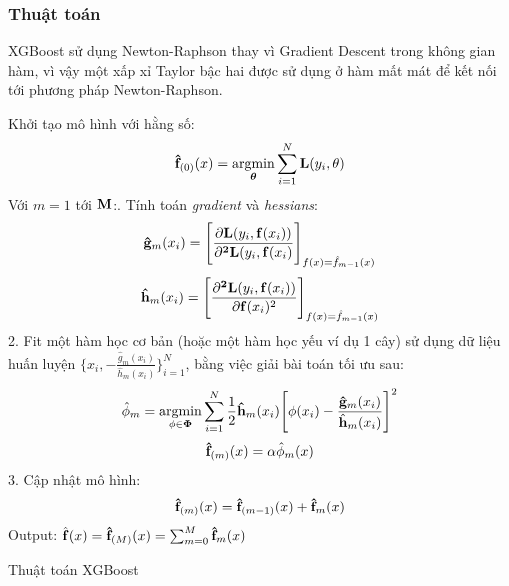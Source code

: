 \subsubsection{Thuật toán}
XGBoost sử dụng Newton-Raphson thay vì Gradient Descent trong không gian hàm, vì vậy một xấp xỉ Taylor bậc hai được sử dụng ở hàm mất mát để kết nối tới phương pháp Newton-Raphson.
    \begin{algorithm}[h!]
        \DontPrintSemicolon
        Khởi tạo mô hình với hằng số:
        \begin{equation*}
            \bold{\hat{f}}_{(0)}(x) = \underset{\boldsymbol{\theta}}{\mathrm{argmin}}\sum^N_{i=1}\bold{L}(y_i,\bold{\theta})
        \end{equation*}\;
        Với $m = 1$ tới $\bold{M}$:. Tính toán \emph{gradient} và \emph{hessians}:
        \begin{equation*}
            \bold{\hat{g}}_m(x_i) = \Bigg[\frac{\bold{\partial}\bold{L}(y_i,\bold{f}(x_i))}{\bold{\partial^2}\bold{L}(y_i,\bold{f}(x_i)}\Bigg]_{f(x)=\hat{f}_{m-1}(x)}
        \end{equation*}
        \begin{equation*}
            \bold{\hat{h}}_m(x_i) = \Bigg[\frac{\bold{\partial^2}\bold{L}(y_i,\bold{f}(x_i))}{\bold{\partial}\bold{f}(x_i)^2}\Bigg]_{f(x)=\hat{f}_{m-1}(x)}
        \end{equation*}
        2. Fit một hàm học cơ bản (hoặc một hàm học yếu ví dụ 1 cây) sử dụng dữ liệu huấn luyện $\Big\{x_i, -\frac{\hat{g}_m(x_i)}{\hat{h}_m(x_i)}\Big\}^N_{i=1}$, bằng việc giải bài toán tối ưu sau:
        \begin{equation*}
            \hat{\phi}_m = \underset{\phi\in\bold{\Phi}}{\mathrm{argmin}}\sum^N_{i=1}\frac{1}{2}\bold{\hat{h}}_m(x_i)\Bigg[\phi(x_i)-\frac{\bold{\hat{g}}_m(x_i)}{\hat{\bold{h}}_m(x_i)}\Bigg]^2
        \end{equation*}
        \begin{equation*}
            \bold{\hat{f}}_{(m)}(x) = \alpha\hat{\phi}_m(x)
        \end{equation*}
        3. Cập nhật mô hình:
        \begin{equation*}
            \bold{\hat{f}}_{(m)}(x) = \bold{\hat{f}}_{(m-1)}(x) + \bold{\hat{f}}_m(x)
        \end{equation*}\;
        Output: $\hat{\bold{f}}(x) = \bold{\hat{f}}_{(M)}(x) = \sum^M_{m=0}\bold{\hat{f}}_m(x)$\;
        \caption{Thuật toán XGBoost}
        \label{alg:xgboost}
    \end{algorithm}
